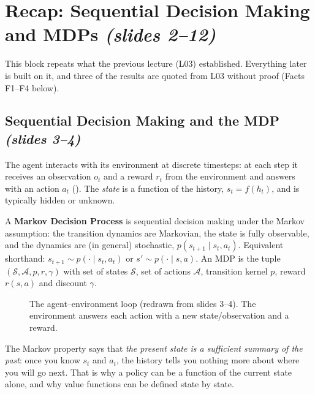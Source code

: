\documentclass[11pt,a4paper]{article}
\newcommand{\slides}[1]{\emph{(slides #1)}}
\newcommand{\cS}{\mathcal{S}}
\newcommand{\cA}{\mathcal{A}}
\theoremstyle{plain}
\theoremstyle{definition}
\theoremstyle{remark}
\begin{document}
\newpage
\section{Recap: Sequential Decision Making and MDPs \slides{2--12}}
This block repeats what the previous lecture (L03) established. Everything later is built on it, and three of the results are quoted from L03 without proof (Facts F1--F4 below).

\subsection{Sequential Decision Making and the MDP \slides{3--4}}
The agent interacts with its environment at discrete timesteps: at each step it receives an observation $o_t$ and a reward $r_t$ from the environment and answers with an action $a_t$ (). The \emph{state} is a function of the history, $s_t=f(h_t)$, and is typically hidden or unknown.

A \textbf{Markov Decision Process} is sequential decision making under the Markov assumption: the transition dynamics are Markovian, the state is fully observable, and the dynamics are (in general) stochastic, $p(s_{t+1}\mid s_t,a_t)$. Equivalent shorthand: $s_{t+1}\sim p(\cdot\mid s_t,a_t)$ or $s'\sim p(\cdot\mid s,a)$. An MDP is the tuple $(\cS,\cA,p,r,\gamma)$ with set of states $\cS$, set of actions $\cA$, transition kernel $p$, reward $r(s,a)$ and discount $\gamma$.

\begin{figure}[htbp]
\centering
{}
\caption{The agent--environment loop (redrawn from slides 3--4). The environment answers each action with a new state/observation and a reward.}
\label{fig:loop}
\end{figure}

\begin{intuition}
The Markov property says that \emph{the present state is a sufficient summary of the past}: once you know $s_t$ and $a_t$, the history tells you nothing more about where you will go next. That is why a policy can be a function of the current state alone, and why value functions can be defined state by state.
\end{intuition}
\end{document}
